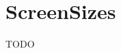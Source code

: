 \documentclass[FIPLY_base.tex]{subfiles}
\begin{document}
\section{ScreenSizes}
TODO
\end{document}
